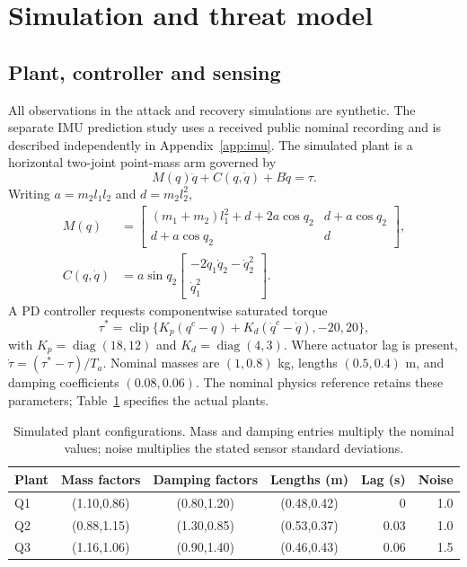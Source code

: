 \documentclass[11pt]{article}
\begin{document}
\section{Simulation and threat model}\label{sec:simulation}
\subsection{Plant, controller and sensing}
All observations in the attack and recovery simulations are synthetic. The separate IMU prediction study uses a received public nominal recording and is described independently in Appendix~\ref{app:imu}. The simulated plant is a horizontal two-joint point-mass arm governed by
\begin{equation}
 M(q)\ddot q+C(q,\dot q)+B\dot q=\tau.
\end{equation}
Writing $a=m_2l_1l_2$ and $d=m_2l_2^2$,
\begin{align}
 M(q)&=\begin{bmatrix}(m_1+m_2)l_1^2+d+2a\cos q_2&d+a\cos q_2\\d+a\cos q_2&d\end{bmatrix},\\
 C(q,\dot q)&=a\sin q_2\begin{bmatrix}-2\dot q_1\dot q_2-\dot q_2^2\\\dot q_1^2\end{bmatrix}.
\end{align}
A PD controller requests componentwise saturated torque
\begin{equation}
 \tau^*=\operatorname{clip}\{K_p(q^c-q)+K_d(\dot q^c-\dot q),-20,20\},
\end{equation}
with $K_p=\operatorname{diag}(18,12)$ and $K_d=\operatorname{diag}(4,3)$. Where actuator lag is present, $\dot\tau=(\tau^*-\tau)/T_a$. Nominal masses are $(1,0.8)$ kg, lengths $(0.5,0.4)$ m, and damping coefficients $(0.08,0.06)$. The nominal physics reference retains these parameters; Table~\ref{tab:plants} specifies the actual plants.

\begin{table}[htbp]\centering\small
\caption{Simulated plant configurations. Mass and damping entries multiply the nominal values; noise multiplies the stated sensor standard deviations.}\label{tab:plants}
\setlength{\tabcolsep}{5pt}
\begin{tabular}{lcccrr}\toprule
Plant & Mass factors & Damping factors & Lengths (m) & Lag (s) & Noise\\\midrule
Q1 & (1.10,0.86) & (0.80,1.20) & (0.48,0.42) & 0 & 1.0\\
Q2 & (0.88,1.15) & (1.30,0.85) & (0.53,0.37) & 0.03 & 1.0\\
Q3 & (1.16,1.06) & (0.90,1.40) & (0.46,0.43) & 0.06 & 1.5\\\bottomrule
\end{tabular}
\end{table}
\end{document}

